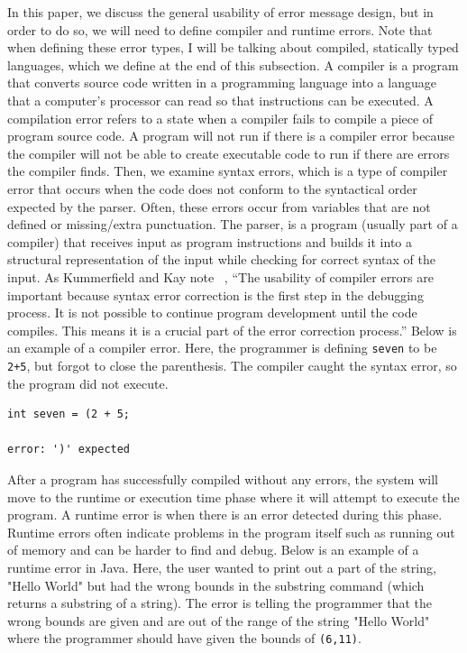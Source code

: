 \documentclass{sig-alternate}
\begin{document}
In this paper, we discuss the general usability of error message design, but in order to do so, we will need to define compiler and runtime errors.
Note that when defining these error types, I will be talking about compiled, statically typed languages, which we define at the end of this subsection.
A compiler is a program that converts source code written in a programming language into a language that a computer's processor can read so that instructions can be executed.
A compilation error refers to a state when a compiler fails to compile a piece of  program source code.
A program will not run if there is a compiler error because the compiler will not be able to create executable code to run if there are errors the compiler finds. 
Then, we examine syntax errors, which is a type of compiler error that occurs when the code does not conform to the syntactical order expected by the parser.
Often, these errors occur from variables that are not defined or missing/extra punctuation.
The parser, is a program (usually part of a compiler) that receives input as program instructions and builds it into a structural representation of the input while checking for correct syntax of the input.
As Kummerfield and Kay note ~\cite{Kummerfeld:2003:NBF:858403.858416}, ``The usability of compiler errors are important because syntax error correction is the first step in the debugging process. It is not possible to continue program development until the code compiles. This means it is a crucial part of the error correction process.''
Below is an example of a compiler error. Here, the programmer is defining \texttt{seven} to be \texttt{2+5}, but forgot to close the parenthesis. The compiler caught the syntax error, so the program did not execute.

\begin{verbatim}
int seven = (2 + 5;

error: ')' expected
\end{verbatim}

After a program has successfully compiled without any errors, the system will move to the runtime or execution time phase where it will attempt to execute the program.
A runtime error is when there is an error detected during this phase.
Runtime errors often indicate problems in the program itself such as running out of memory and can be harder to find and debug.
Below is an example of a runtime error in Java.
Here, the user wanted to print out a part of the string, "Hello World" but had the wrong bounds in the substring command (which returns a substring of a string).
The error is telling the programmer that the wrong bounds are given and are out of the range of the string "Hello World" where the programmer should have given the bounds of \texttt{(6,11)}.
\end{document}
